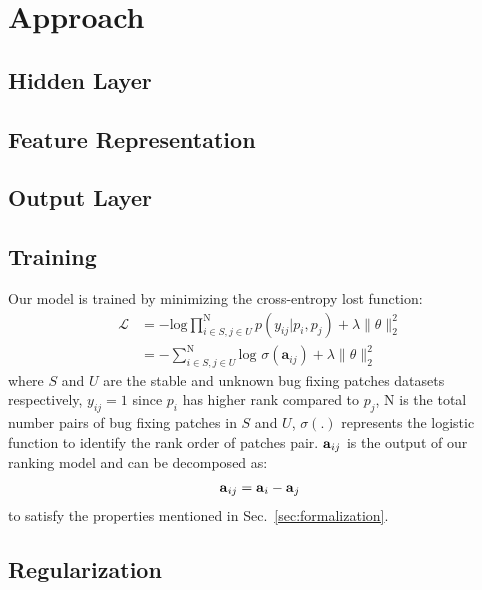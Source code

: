 \section{Approach}
\label{sec:approach}



\subsection{Hidden Layer}
\label{sec:hiddenlayer}

\subsection{Feature Representation}
\label{sec:feature}

\subsection{Output Layer}
\label{sec:output}

\subsection{Training}
\label{sec:trainingmodel}
Our model is trained by minimizing the cross-entropy lost function: 
\begin{equation}
\begin{split}
	\mathcal{L} &= -\text{log}\prod^\text{N}_{i \in S,j \in U}p(y_{ij}|p_i,p_j) + \lambda \lVert \theta \lVert^2_2 \\ &= -\sum_{i \in S,j \in U}^\text{N} \text{log } \sigma (\textbf{a}_{ij}) + \lambda \lVert \theta \lVert^2_2
\end{split}
\end{equation}
where $S$ and $U$ are the stable and unknown bug fixing patches datasets respectively, $y_{ij} = 1$ since $p_i$ has higher rank compared to $p_j$, N is the total number pairs of bug fixing patches in $S$ and $U$, $\sigma(.)$ represents the logistic function to identify the rank order of patches pair. $\text{\textbf{a}}_{ij}$ is the output of our ranking model and can be decomposed as:
\begin{equation}
\begin{split}
\text{\textbf{a}}_{ij} & = \text{\textbf{a}}_i - \text{\textbf{a}}_{j} \\
\end{split}
\end{equation}
to satisfy the properties mentioned in Sec.~\ref{sec:formalization}. 

\subsection{Regularization}
\label{sec:regularization}



